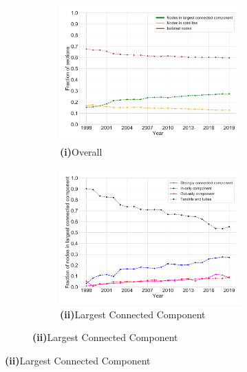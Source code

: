 \documentclass[varwidth, border=0pt]{standalone}
\begin{document}
	
	\begin{figure}
	\centering
\begin{subfigure}{\linewidth}
	\begin{multicols}{2}
		\centering
		\begin{subfigure}{\linewidth}
			\includegraphics[width=\linewidth]{../../graphics/connectivity-development-regulations-only-us.pdf}
			\caption*{\textbf{\textsf{(i)}}\quad Overall}
		\end{subfigure}
		\newpage
		\begin{subfigure}{\linewidth}
			\includegraphics[width=\linewidth]{../../graphics/connectivity-lcc-regulations-only-us.pdf}
			\caption*{\textbf{\textsf{(ii)}}\quad Largest Connected Component}
		\end{subfigure}	
	\end{multicols}
	\vspace*{-6pt}
\end{subfigure}


\end{figure}
\end{document}
